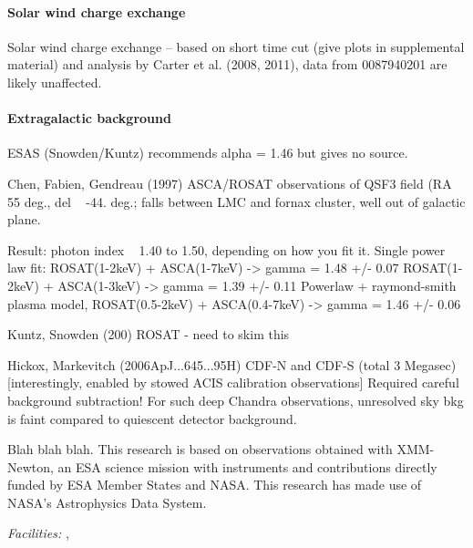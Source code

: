 \documentclass[manuscript]{aastex6}  %
\begin{document}
\paragraph{Solar wind charge exchange}

Solar wind charge exchange -- based on short time cut (give plots in
supplemental material) and analysis by Carter et al. (2008, 2011),
data from 0087940201 are likely unaffected.

\paragraph{Extragalactic background}

ESAS (Snowden/Kuntz) recommends alpha = 1.46 but gives no source.

Chen, Fabien, Gendreau (1997)
  ASCA/ROSAT observations of QSF3 field (RA ~ 55 deg., del ~ -44. deg.; falls
  between LMC and fornax cluster, well out of galactic plane.

  Result: photon index ~ 1.40 to 1.50, depending on how you fit it.
  Single power law fit:
    ROSAT(1-2keV) + ASCA(1-7keV) -> gamma = 1.48 +/- 0.07
    ROSAT(1-2keV) + ASCA(1-3keV) -> gamma = 1.39 +/- 0.11
  Powerlaw + raymond-smith plasma model,
    ROSAT(0.5-2keV) + ASCA(0.4-7keV) -> gamma = 1.46 +/- 0.06

Kuntz, Snowden (200)
    ROSAT - need to skim this

Hickox, Markevitch (2006ApJ...645...95H)
    CDF-N and CDF-S (total 3 Megasec)
    [interestingly, enabled by stowed ACIS calibration observations]
    Required careful background subtraction!
      For such deep Chandra observations, unresolved sky bkg is faint compared
      to quiescent detector background.


\acknowledgments

Blah blah blah.
This research is based on observations obtained with XMM-Newton, an ESA science
mission with instruments and contributions directly funded by ESA Member States
and NASA.
This research has made use of NASA's Astrophysics Data System.

{\it Facilities:} , 





%
\end{document}
